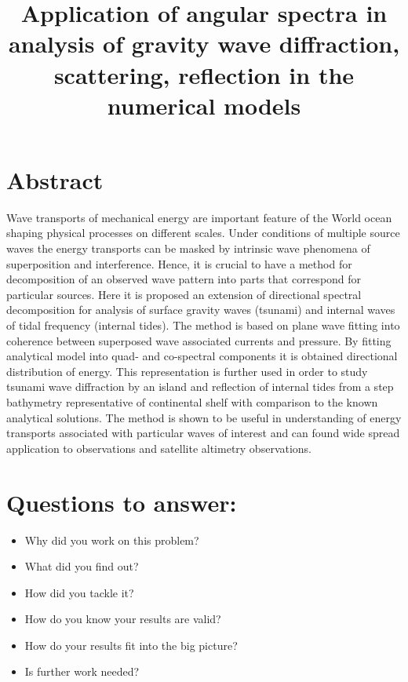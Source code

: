 



\title{Application of angular spectra in analysis of gravity wave diffraction, scattering, reflection in the numerical models}
\maketitle

\section{Abstract}
Wave transports of mechanical energy are important feature of the World ocean shaping physical processes on different scales. Under conditions of multiple source waves the energy transports can be masked by intrinsic wave phenomena of superposition and interference. Hence, it is crucial to have a method for decomposition of an observed wave pattern into parts that correspond for particular sources. Here it is proposed an extension of directional spectral decomposition for analysis of surface gravity waves (tsunami) and internal waves of tidal frequency (internal tides). The method is based on plane wave fitting into coherence between superposed wave associated currents and pressure. By fitting analytical model into quad- and co-spectral components it is obtained directional distribution of energy. This representation is further used in order to study tsunami wave diffraction by an island and reflection of internal tides from a step bathymetry representative of continental shelf with comparison to the known analytical solutions. The method is shown to be useful in understanding of energy transports associated with particular waves of interest and can found wide spread application to observations and satellite altimetry observations.

\section*{Questions to answer:}
\begin{itemize}
\item Why did you work on this problem?
\item What did you find out?
\item How did you tackle it?
\item How do you know your results are valid?
\item How do your results fit into the big picture?
\item Is further work needed?
\end{itemize}

